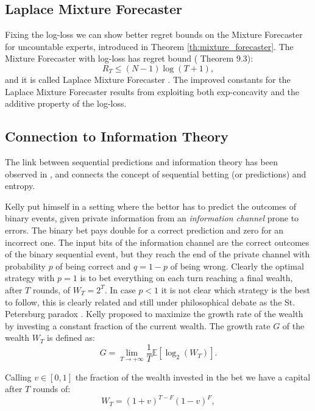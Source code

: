 \subsection{Laplace Mixture Forecaster}\label{sec:laplace_mixture}

Fixing the log-loss we can show better regret bounds on the Mixture Forecaster for uncountable experts, introduced in Theorem \ref{th:mixture_forecaster}. The Mixture Forecaster with log-loss has regret bound (\cite{cesa2006prediction} Theorem 9.3):
\begin{equation}
R_T\le(N-1)\log(T+1),
\end{equation}
and it is called Laplace Mixture Forecaster \cite{weinberger1994optimal}. The improved constants for the Laplace Mixture Forecaster results from exploiting both exp-concavity and the additive property of the log-loss.

\subsection{Connection to Information Theory}\label{sec:Info} 

The link between sequential predictions and information theory has been observed in \cite{kelly2011new}, and connects the concept of sequential betting (or predictions) and entropy.

Kelly put himself in a setting where the bettor has to predict the outcomes of binary events, given private information from an \emph{information channel} prone to errors. The binary bet pays double for a correct prediction and zero for an incorrect one. The input bits of the information channel are the correct outcomes of the binary sequential event, but they reach the end of the private channel with probability $p$ of being correct and $q=1-p$ of being wrong. Clearly the optimal strategy with $p=1$ is to bet everything on each turn reaching a final wealth, after $T$ rounds, of $W_T=2^T$. In case $p<1$ it is not clear which strategy is the best to follow, this is clearly related and still under philosophical debate as the St. Petersburg paradox \cite{samuelson1977st}. Kelly proposed to maximize the growth rate of the wealth by investing a constant fraction of the current wealth. The growth rate $G$ of the wealth $W_T$ is defined as:
$$G=\lim\limits_{T\to+\infty}\frac{1}{T}\mathbb E[\log_2(W_T)].$$

Calling $v\in[0,1]$ the fraction of the wealth invested in the bet we have a capital after $T$ rounds of:
$$W_T=(1+v)^{T-F}(1-v)^{F},$$ 

